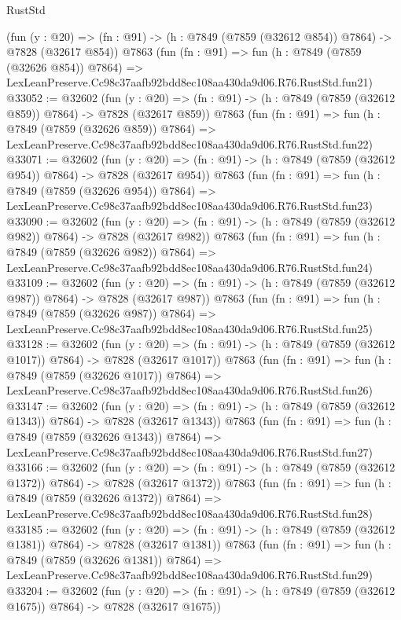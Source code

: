 \begin{lexlean}{RustStd}
\begin{coremodule}
    (fun (y : @20) => (fn : @91) -> (h : @7849 (@7859 (@32612 @854)) @7864) -> @7828 (@32617 @854))
    @7863
    (fun (fn : @91) =>
    fun (h : @7849 (@7859 (@32626 @854)) @7864) =>
    LexLeanPreserve.Cc98c37aafb92bdd8ec108aa430da9d06.R76.RustStd.fun21)
@33052 := @32602
    (fun (y : @20) => (fn : @91) -> (h : @7849 (@7859 (@32612 @859)) @7864) -> @7828 (@32617 @859))
    @7863
    (fun (fn : @91) =>
    fun (h : @7849 (@7859 (@32626 @859)) @7864) =>
    LexLeanPreserve.Cc98c37aafb92bdd8ec108aa430da9d06.R76.RustStd.fun22)
@33071 := @32602
    (fun (y : @20) => (fn : @91) -> (h : @7849 (@7859 (@32612 @954)) @7864) -> @7828 (@32617 @954))
    @7863
    (fun (fn : @91) =>
    fun (h : @7849 (@7859 (@32626 @954)) @7864) =>
    LexLeanPreserve.Cc98c37aafb92bdd8ec108aa430da9d06.R76.RustStd.fun23)
@33090 := @32602
    (fun (y : @20) => (fn : @91) -> (h : @7849 (@7859 (@32612 @982)) @7864) -> @7828 (@32617 @982))
    @7863
    (fun (fn : @91) =>
    fun (h : @7849 (@7859 (@32626 @982)) @7864) =>
    LexLeanPreserve.Cc98c37aafb92bdd8ec108aa430da9d06.R76.RustStd.fun24)
@33109 := @32602
    (fun (y : @20) => (fn : @91) -> (h : @7849 (@7859 (@32612 @987)) @7864) -> @7828 (@32617 @987))
    @7863
    (fun (fn : @91) =>
    fun (h : @7849 (@7859 (@32626 @987)) @7864) =>
    LexLeanPreserve.Cc98c37aafb92bdd8ec108aa430da9d06.R76.RustStd.fun25)
@33128 := @32602
    (fun (y : @20) =>
    (fn : @91) -> (h : @7849 (@7859 (@32612 @1017)) @7864) -> @7828 (@32617 @1017))
    @7863
    (fun (fn : @91) =>
    fun (h : @7849 (@7859 (@32626 @1017)) @7864) =>
    LexLeanPreserve.Cc98c37aafb92bdd8ec108aa430da9d06.R76.RustStd.fun26)
@33147 := @32602
    (fun (y : @20) =>
    (fn : @91) -> (h : @7849 (@7859 (@32612 @1343)) @7864) -> @7828 (@32617 @1343))
    @7863
    (fun (fn : @91) =>
    fun (h : @7849 (@7859 (@32626 @1343)) @7864) =>
    LexLeanPreserve.Cc98c37aafb92bdd8ec108aa430da9d06.R76.RustStd.fun27)
@33166 := @32602
    (fun (y : @20) =>
    (fn : @91) -> (h : @7849 (@7859 (@32612 @1372)) @7864) -> @7828 (@32617 @1372))
    @7863
    (fun (fn : @91) =>
    fun (h : @7849 (@7859 (@32626 @1372)) @7864) =>
    LexLeanPreserve.Cc98c37aafb92bdd8ec108aa430da9d06.R76.RustStd.fun28)
@33185 := @32602
    (fun (y : @20) =>
    (fn : @91) -> (h : @7849 (@7859 (@32612 @1381)) @7864) -> @7828 (@32617 @1381))
    @7863
    (fun (fn : @91) =>
    fun (h : @7849 (@7859 (@32626 @1381)) @7864) =>
    LexLeanPreserve.Cc98c37aafb92bdd8ec108aa430da9d06.R76.RustStd.fun29)
@33204 := @32602
    (fun (y : @20) =>
    (fn : @91) -> (h : @7849 (@7859 (@32612 @1675)) @7864) -> @7828 (@32617 @1675))

\end{coremodule}
\end{lexlean}
